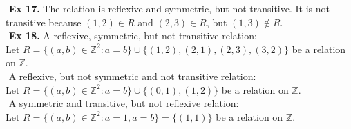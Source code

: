\documentclass{article}
\begin{document}
$ $\newline
\noindent \textbf{Ex 17.} The relation is reflexive and symmetric, but not transitive. It is not transitive because $(1,2) \in R$ and $(2,3) \in R$, but $(1,3) \not\in R$.\\
$ $\newline
\noindent \textbf{Ex 18.}
\noindent A reflexive, symmetric, but not transitive relation:\\
Let $R= \{(a,b) \in \mathbb{Z}^2 : a = b\} \cup \{(1,2), (2,1), (2,3), (3,2)\}$ be a relation on $\mathbb{Z}$.\\
$ $\newline
A reflexive, but not symmetric and not transitive relation:\\
Let $R= \{(a,b) \in \mathbb{Z}^2 : a = b\} \cup \{(0,1), (1,2)\}$ be a relation on $\mathbb{Z}$.\\
$ $\newline
A symmetric and transitive, but not reflexive relation:\\
Let $R = \{(a,b) \in \mathbb{Z}^2 : a = 1, a = b\} = \{ (1,1) \}$ be a relation on $\mathbb{Z}$.
\end{document}
